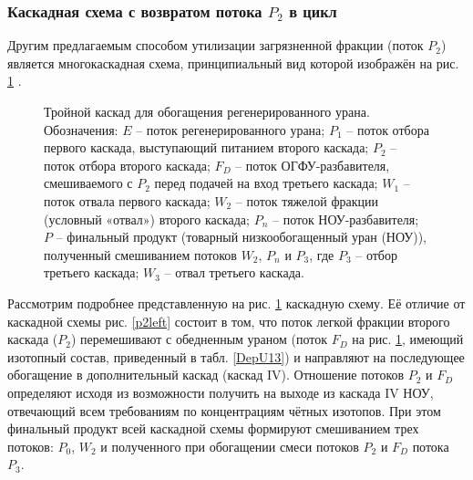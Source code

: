 {\subsubsection{Каскадная схема с возвратом потока $P_2$ в цикл}

Другим предлагаемым способом утилизации загрязненной фракции (поток $P_2$) является многокаскадная схема, принципиальный вид которой изображён на рис. \ref{p2_withDepU} \cite{smirnovApplyingEnrichmentCapacities2018}.

\begin{figure}[ht]
    \caption{Тройной каскад для обогащения регенерированного урана. Обозначения: $E$ -- поток регенерированного урана; $P_1$ -- поток отбора первого каскада, выступающий питанием второго каскада; $P_2$ -- поток отбора второго каскада; $F_{D}$ -- поток ОГФУ-разбавителя, смешиваемого с $P_2$ перед подачей на вход третьего каскада; $W_1$ -- поток отвала первого каскада; $W_2$ -- поток тяжелой фракции (условный «отвал») второго каскада; $P_n$ -- поток НОУ-разбавителя; $P$ -- финальный продукт (товарный низкообогащенный уран (НОУ)), полученный смешиванием потоков $W_2$, $P_n$ и $P_3$, где $P_3$ -- отбор третьего каскада; $W_3$ -- отвал третьего каскада.}\label{p2_withDepU}
\end{figure}

Рассмотрим подробнее представленную на рис. \ref{p2_withDepU} каскадную схему. Её отличие от каскадной схемы рис. \ref{p2left} состоит в том, что поток легкой фракции второго каскада ($P_2$) перемешивают с обедненным ураном (поток $F_{D}$ на рис. \ref{p2_withDepU}, имеющий изотопный состав, приведенный в табл. \ref{DepU13}) и направляют на последующее обогащение в дополнительный каскад (каскад IV). Отношение потоков $P_2$ и $F_{D}$ определяют исходя из возможности получить на выходе из каскада IV НОУ, отвечающий всем требованиям по концентрациям чётных изотопов. При этом финальный продукт всей каскадной схемы формируют смешиванием трех потоков: $P_0$, $W_2$ и полученного при обогащении смеси потоков $P_2$ и $F_{D}$ потока $P_3$.

}
